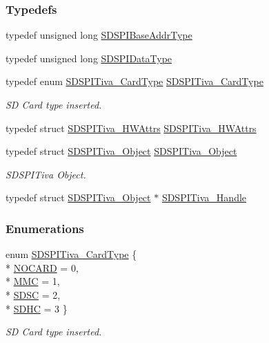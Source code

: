 \subsubsection*{Typedefs}
\begin{DoxyCompactItemize}
\item 
typedef unsigned long \hyperlink{_s_d_s_p_i_tiva_8h_ad2ee2f6fbdb79c0577161ae92a7f1650}{S\-D\-S\-P\-I\-Base\-Addr\-Type}
\item 
typedef unsigned long \hyperlink{_s_d_s_p_i_tiva_8h_ae10295fbeb91d6f844cc3694462f6a4b}{S\-D\-S\-P\-I\-Data\-Type}
\item 
typedef enum \hyperlink{_s_d_s_p_i_tiva_8h_a735a3f0fb087ca4e97c2e43ed68b1a0a}{S\-D\-S\-P\-I\-Tiva\-\_\-\-Card\-Type} \hyperlink{_s_d_s_p_i_tiva_8h_a8be51464b363a4b75b1fc43f2c024a7b}{S\-D\-S\-P\-I\-Tiva\-\_\-\-Card\-Type}
\begin{DoxyCompactList}\small\item\em S\-D Card type inserted. \end{DoxyCompactList}\item 
typedef struct \hyperlink{struct_s_d_s_p_i_tiva___h_w_attrs}{S\-D\-S\-P\-I\-Tiva\-\_\-\-H\-W\-Attrs} \hyperlink{_s_d_s_p_i_tiva_8h_ac5f29095c7480b699bca3f48b02aa425}{S\-D\-S\-P\-I\-Tiva\-\_\-\-H\-W\-Attrs}
\item 
typedef struct \hyperlink{struct_s_d_s_p_i_tiva___object}{S\-D\-S\-P\-I\-Tiva\-\_\-\-Object} \hyperlink{_s_d_s_p_i_tiva_8h_ae4ba47bb2c40444c9cc6320f1a36008c}{S\-D\-S\-P\-I\-Tiva\-\_\-\-Object}
\begin{DoxyCompactList}\small\item\em S\-D\-S\-P\-I\-Tiva Object. \end{DoxyCompactList}\item 
typedef struct \hyperlink{struct_s_d_s_p_i_tiva___object}{S\-D\-S\-P\-I\-Tiva\-\_\-\-Object} $\ast$ \hyperlink{_s_d_s_p_i_tiva_8h_ac351c9ecad35997bc63232591cc2f13e}{S\-D\-S\-P\-I\-Tiva\-\_\-\-Handle}
\end{DoxyCompactItemize}
\subsubsection*{Enumerations}
\begin{DoxyCompactItemize}
\item 
enum \hyperlink{_s_d_s_p_i_tiva_8h_a735a3f0fb087ca4e97c2e43ed68b1a0a}{S\-D\-S\-P\-I\-Tiva\-\_\-\-Card\-Type} \{ \\*
\hyperlink{_s_d_s_p_i_tiva_8h_a735a3f0fb087ca4e97c2e43ed68b1a0aa422cdc20ba86c8cdcf1f0fd2318a1cfc}{N\-O\-C\-A\-R\-D} = 0, 
\\*
\hyperlink{_s_d_s_p_i_tiva_8h_a735a3f0fb087ca4e97c2e43ed68b1a0aaa7d8fca3406f36682514f0384d910fac}{M\-M\-C} = 1, 
\\*
\hyperlink{_s_d_s_p_i_tiva_8h_a735a3f0fb087ca4e97c2e43ed68b1a0aa87550a2102744c14e5e2e0ed39cc04b2}{S\-D\-S\-C} = 2, 
\\*
\hyperlink{_s_d_s_p_i_tiva_8h_a735a3f0fb087ca4e97c2e43ed68b1a0aab27db2a19a825c3e6f1513cdab7c81ea}{S\-D\-H\-C} = 3
 \}
\begin{DoxyCompactList}\small\item\em S\-D Card type inserted. \end{DoxyCompactList}\end{DoxyCompactItemize}
